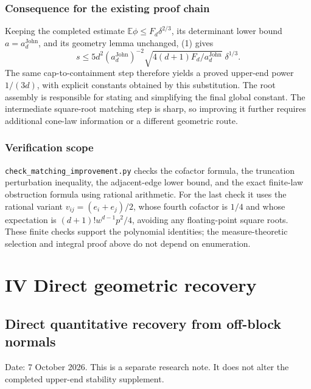 \documentclass[
  11pt,
]{article}
\begin{document}
\subsubsection{Consequence for the existing proof
chain}\label{consequence-for-the-existing-proof-chain}

Keeping the completed estimate \(\mathbb E\phi\le F_d\delta^{2/3}\), its
determinant lower bound \(a=a_d^{\mathrm{John}}\), and its geometry
lemma unchanged, (1) gives \[
 s\le5d^2(a_d^{\mathrm{John}})^{-2}
       \sqrt{4(d+1)F_d/a_d^{\mathrm{John}}}\;\delta^{1/3}.
\] The same cap-to-containment step therefore yields a proved upper-end
power \(1/(3d)\), with explicit constants obtained by this substitution.
The root assembly is responsible for stating and simplifying the final
global constant. The intermediate square-root matching step is sharp, so
improving it further requires additional cone-law information or a
different geometric route.

\subsubsection{Verification scope}\label{verification-scope}

\texttt{check\_matching\_improvement.py} checks the cofactor formula,
the truncation perturbation inequality, the adjacent-edge lower bound,
and the exact finite-law obstruction formula using rational arithmetic.
For the last check it uses the rational variant \(v_{ij}=(e_i+e_j)/2\),
whose fourth cofactor is \(1/4\) and whose expectation is
\((d+1)!w^{d-1}p^2/4\), avoiding any floating-point square roots. These
finite checks support the polynomial identities; the measure-theoretic
selection and integral proof above do not depend on enumeration.

\newpage

\section{IV Direct geometric
recovery}\label{iv-direct-geometric-recovery}

\subsection{Direct quantitative recovery from off-block
normals}\label{direct-quantitative-recovery-from-off-block-normals}

Date: 7 October 2026. This is a separate research note. It does not
alter the completed upper-end stability supplement.
\end{document}

